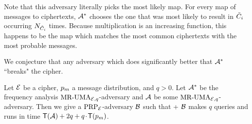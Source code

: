 	
 Note that this adversary literally picks the most likely map. For every map of messages to ciphertexts, ${\mathcal A}^*$ chooses the one that was most likely to result in $\tilde{C}_i$ occurring $N_{\tilde{C}_i}$ times. Because multiplication is an increasing function, this happens to be the map which matches the most common ciphertexts with the most probable messages.
 
 We conjecture that any adversary which does significantly better that ${\mathcal A}^*$ ``breaks" the cipher.
\begin{theorem}
	\label{freq-opt}

Let ${\cal E}$ be a cipher, $p_m$ a message distribution, and $q>0$. Let
${\mathcal A}^*$ be the frequency analysis $\textnormal{MR-UMA}_{{\cal E},q}$-adversary and ${\mathcal A}$
be some $\textnormal{MR-UMA}_{{\cal E},q}$-adversary. Then we give a
$\textnormal{PRP}_{\cal E}$-adversary ${\mathcal B}$ such that
\bnm
   \le 
         + \AdvPRP{\cipher}{\advB}
\enm
${\mathcal B}$ makes $q$ queries and runs in time 
$\textsf{T}({\mathcal A}) + 2q+q{\hspace{-0.1ex}}{\hspace{-0.1ex}}{\hspace{-0.1ex}}\cdot{\hspace{-0.1ex}}{\hspace{-0.1ex}}{\hspace{-0.1ex}}\textsf{T}(p_m)$.
\end{theorem}

